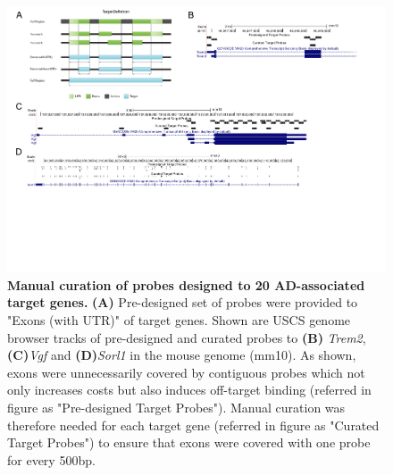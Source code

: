 \begin{landscape}
	\begin{figure}[!ht]
		\begin{center}
			\includegraphics[page=1,trim={0cm 10cm 0cm 0cm},clip,scale = 0.90]{Figures/TargetProbes_Visualisation.pdf}
		\end{center}
		\captionsetup{width=1.5\textwidth}
		\caption[Manual curation of probes designed to 20 AD-associated target genes]%
		{\textbf{Manual curation of probes designed to 20 AD-associated target genes.} \textbf{(A)} Pre-designed set of probes were provided to "Exons (with UTR)" of target genes. Shown are USCS genome browser tracks of pre-designed and curated probes to \textbf{(B)} \textit{Trem2}, \textbf{(C)}\textit{Vgf} and \textbf{(D)}\textit{Sorl1} in the mouse genome (mm10). As shown, exons were unnecessarily covered by contiguous probes which not only increases costs but also induces off-target binding (referred in figure as "Pre-designed Target Probes"). Manual curation was therefore needed for each target gene (referred in figure as "Curated Target Probes") to ensure that exons were covered with one probe for every 500bp. }
		\label{fig:target_probes_eg}
	\end{figure}
\end{landscape}

